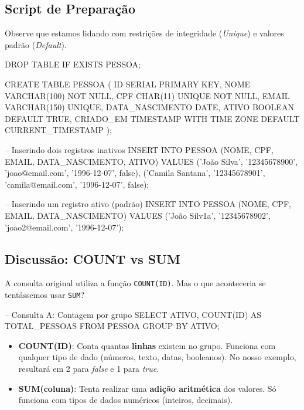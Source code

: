 \subsection{Script de Preparação}

Observe que estamos lidando com restrições de integridade (\textit{Unique}) e valores padrão (\textit{Default}).

\begin{sqlcode}
DROP TABLE IF EXISTS PESSOA;

CREATE TABLE PESSOA (
    ID SERIAL PRIMARY KEY,
    NOME VARCHAR(100) NOT NULL,
    CPF CHAR(11) UNIQUE NOT NULL,
    EMAIL VARCHAR(150) UNIQUE,
    DATA_NASCIMENTO DATE,
    ATIVO BOOLEAN DEFAULT TRUE,
    CRIADO_EM TIMESTAMP WITH TIME ZONE DEFAULT CURRENT_TIMESTAMP
);

-- Inserindo dois registros inativos
INSERT INTO PESSOA (NOME, CPF, EMAIL, DATA_NASCIMENTO, ATIVO)
VALUES ('João Silva', '12345678900', 'joao@email.com', '1996-12-07', false),
       ('Camila Santana', '12345678901', 'camila@email.com', '1996-12-07', false);

-- Inserindo um registro ativo (padrão)
INSERT INTO PESSOA (NOME, CPF, EMAIL, DATA_NASCIMENTO)
VALUES ('João Silv1a', '12345678902', 'joao2@email.com', '1996-12-07');
\end{sqlcode}

\subsection{Discussão: COUNT vs SUM}

A consulta original utiliza a função \texttt{COUNT(ID)}. Mas o que aconteceria se tentássemos usar \texttt{SUM}?



\begin{sqlcode}
-- Consulta A: Contagem por grupo
SELECT ATIVO, COUNT(ID) AS TOTAL_PESSOAS 
FROM PESSOA 
GROUP BY ATIVO;
\end{sqlcode}

\begin{tcolorbox}[colback=red!5,colframe=red!75!black,title=Conceito Fundamental]
\begin{itemize}
    \item \textbf{COUNT(ID)}: Conta quantas \textbf{linhas} existem no grupo. Funciona com qualquer tipo de dado (números, texto, datas, booleanos). No nosso exemplo, resultará em 2 para \textit{false} e 1 para \textit{true}.
    \item \textbf{SUM(coluna)}: Tenta realizar uma \textbf{adição aritmética} dos valores. Só funciona com tipos de dados numéricos (inteiros, decimais).
\end{itemize}
\end{tcolorbox}

